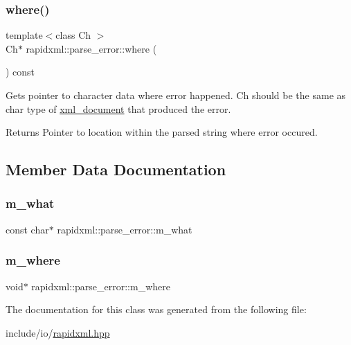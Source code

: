 \subsubsection{\texorpdfstring{where()}{where()}}
{\footnotesize\ttfamily template$<$class Ch $>$ \\
Ch$\ast$ rapidxml\+::parse\+\_\+error\+::where (\begin{DoxyParamCaption}{ }\end{DoxyParamCaption}) const\hspace{0.3cm}{\ttfamily [inline]}}

Gets pointer to character data where error happened. Ch should be the same as char type of \mbox{\hyperlink{classrapidxml_1_1xml__document}{xml\+\_\+document}} that produced the error. \begin{DoxyReturn}{Returns}
Pointer to location within the parsed string where error occured. 
\end{DoxyReturn}


\subsection{Member Data Documentation}
\mbox{\label{classrapidxml_1_1parse__error_a41bffadc72eec238cf4b7d14c10c16ca}} 
\subsubsection{\texorpdfstring{m\_what}{m\_what}}
{\footnotesize\ttfamily const char$\ast$ rapidxml\+::parse\+\_\+error\+::m\+\_\+what\hspace{0.3cm}{\ttfamily [private]}}

\mbox{\label{classrapidxml_1_1parse__error_aa5a164653ac347adddf47b264620d80f}} 
\subsubsection{\texorpdfstring{m\_where}{m\_where}}
{\footnotesize\ttfamily void$\ast$ rapidxml\+::parse\+\_\+error\+::m\+\_\+where\hspace{0.3cm}{\ttfamily [private]}}



The documentation for this class was generated from the following file\+:\begin{DoxyCompactItemize}
\item 
include/io/\mbox{\hyperlink{rapidxml_8hpp}{rapidxml.\+hpp}}\end{DoxyCompactItemize}
